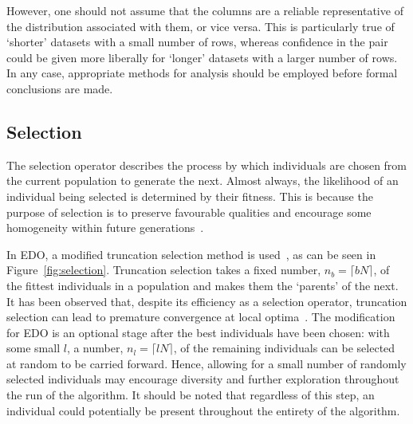 However, one should not assume that the columns are a reliable representative of
the distribution associated with them, or vice versa. This is particularly true
of `shorter' datasets with a small number of rows, whereas confidence in the
pair could be given more liberally for `longer' datasets with a larger number
of rows. In any case, appropriate methods for analysis should be employed before
formal conclusions are made.


\subsection{Selection}

The selection operator describes the process by which individuals are chosen
from the current population to generate the next. Almost always, the likelihood
of an individual being selected is determined by their fitness. This is because
the purpose of selection is to preserve favourable qualities and encourage some
homogeneity within future generations~\cite{Back1994}.


In EDO, a modified truncation selection method is used~\cite{Jebari2013}, as can
be seen in Figure~\ref{fig:selection}. Truncation selection takes a fixed
number, \(n_b = \lceil b N\rceil\), of the fittest individuals in a population
and makes them the `parents' of the next. It has been observed that, despite
its efficiency as a selection operator, truncation selection can lead to
premature convergence at local optima~\cite{Jebari2013,Motoki2002}. The
modification for EDO is an optional stage after the best individuals have been
chosen: with some small \(l\), a number, \(n_l = \lceil l N\rceil\), of the
remaining individuals can be selected at random to be carried forward. Hence,
allowing for a small number of randomly selected individuals may encourage
diversity and further exploration throughout the run of the algorithm. It should
be noted that regardless of this step, an individual could potentially be
present throughout the entirety of the algorithm.

